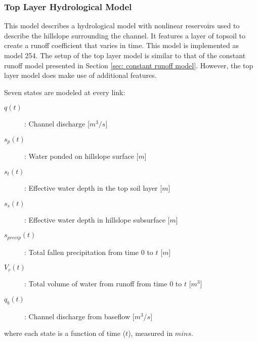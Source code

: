 \documentclass[12pt]{article}
\begin{document}
\subsubsection{Top Layer Hydrological Model} \label{sec: top layer hydrological model}

This model describes a hydrological model with nonlinear reservoirs used to describe the hillslope surrounding the channel. It features a layer of topsoil to create a runoff coefficient that varies in time. This model is implemented as model 254. The setup of the top layer model is similar to that of the constant runoff model presented in Section \ref{sec: constant runoff model}. However, the top layer model does make use of additional features.

Seven states are modeled at every link:
\begin{description}
 \item[$q(t)$]: Channel discharge [$m^3/s$]
 \item[$s_p(t)$]: Water ponded on hillslope surface [$m$]
 \item[$s_t(t)$]: Effective water depth in the top soil layer [$m$]
 \item[$s_s(t)$]: Effective water depth in hillslope subsurface [$m$]
 \item[$s_{precip}(t)$]: Total fallen precipitation from time $0$ to $t$ [$m$]
 \item[$V_r(t)$]: Total volume of water from runoff from time $0$ to $t$ [$m^3$]
 \item[$q_b(t)$]: Channel discharge from baseflow [$m^3/s$]
\end{description}
where each state is a function of time ($t$), measured in $mins$.
\end{document}
